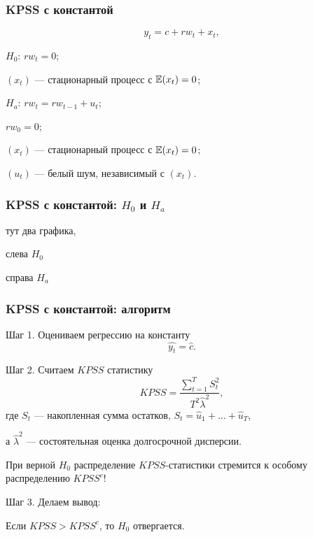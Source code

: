   
  \begin{frame}
    \frametitle{KPSS с константой}
    \[
      y_t = c + rw_t + x_t,
    \]
  
    \pause
  
    \alert{$H_0$: $rw_t = 0$};
    
    $(x_t)$ — стационарный процесс с $\mathbb{E}(x_t) = 0$;
    
    \pause
  
    \alert{$H_a$: $rw_t = rw_{t-1} + u_t$};

    $rw_0 = 0$;
  
    $(x_t)$ — стационарный процесс с $\mathbb{E}(x_t) = 0$;

    $(u_t)$ — белый шум, независимый с $(x_t)$.
  
  \end{frame}
  
  \begin{frame}
    \frametitle{KPSS с константой: $H_0$ и $H_a$}
  
  
    тут два графика,
  
  
    слева $H_0$
    
    справа $H_a$
  
  
  \end{frame}
  
  \begin{frame}
    \frametitle{KPSS с константой: алгоритм}
  
    Шаг 1. Оцениваем \alert{регрессию на константу} 
    \[
      \widehat{y_t} = \hat c.  
    \]
  
    \pause
    Шаг 2. Считаем $KPSS$ статистику
    \[
    KPSS = \frac{\sum_{t=1}^T S_t^2}{T^2 \hat \lambda^2},
    \]
    где $S_t$ — накопленная сумма остатков, $S_t = \hat u_1 + \ldots + \hat u_T$,

    а $\hat\lambda^2$ — состоятельная оценка долгосрочной дисперсии. 
  
    \pause
    При верной $H_0$ распределение $KPSS$-статистики стремится к \alert{особому распределению} $KPSS^c$!
  
    \pause 
    Шаг 3. Делаем вывод:
    
    Если $KPSS > KPSS^c$, то $H_0$ отвергается. 
  
  \end{frame}
  
